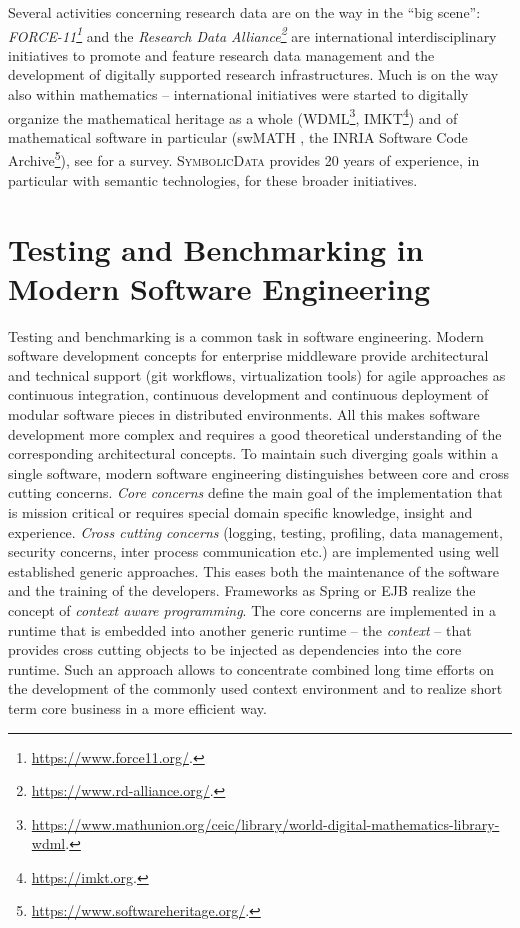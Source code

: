 \documentclass[12pt]{article}
\def\SD{\textsc{Sym\-bolic\-Data}}
\begin{document}
Several activities concerning research data are on the way in the ``big
scene'': \emph{FORCE-11\footnote{\url{https://www.force11.org/}.}} and the
\emph{Research Data Alliance\footnote{\url{https://www.rd-alliance.org/}.}}
are international interdisciplinary initiatives to promote and feature research
data management and the development of digitally supported research
infrastructures.  Much is on the way also within mathematics -- international
initiatives were started to digitally organize the mathematical heritage as a
whole
(WDML\footnote{\url{https://www.mathunion.org/ceic/library/world-digital-mathematics-library-wdml}.},
IMKT\footnote{\url{https://imkt.org}.}) and of mathematical software in
particular (swMATH \cite{swmath}, the INRIA Software Code
Archive\footnote{\url{https://www.softwareheritage.org/}.}), see \cite{cca-16}
for a survey.  {\SD} provides 20 years of experience, in particular with
semantic technologies, for these broader initiatives.

\section{Testing and Benchmarking in Modern Software Engineering}

Testing and benchmarking is a common task in software engineering. Modern
software development concepts for enterprise middleware provide architectural
and technical support (git workflows, virtualization tools) for agile
approaches as continuous integration, continuous development and continuous
deployment of modular software pieces in distributed environments.  All this
makes software development more complex and requires a good theoretical
understanding of the corresponding architectural concepts.  To maintain such
diverging goals within a single software, modern software engineering
distinguishes between core and cross cutting concerns. \emph{Core concerns}
define the main goal of the implementation that is mission critical or requires
special domain specific knowledge, insight and experience. \emph{Cross cutting
  concerns} (logging, testing, profiling, data management, security concerns,
inter process communication etc.) are implemented using well established generic
approaches.  This eases both the maintenance of the software and the training
of the developers. Frameworks as Spring or EJB realize the concept of
\emph{context aware programming}.  The core concerns are implemented in a
runtime that is embedded into another generic runtime -- the \emph{context} --
that provides cross cutting objects to be injected as dependencies into the
core runtime.  Such an approach allows to concentrate combined long time
efforts on the development of the commonly used context environment and to
realize short term core business in a more efficient way.
\end{document}

